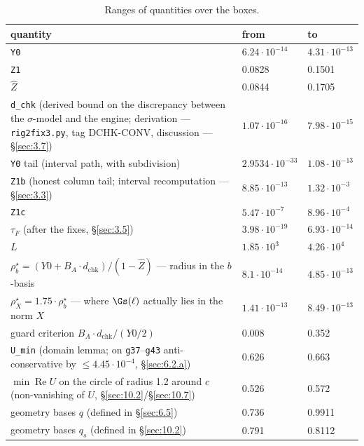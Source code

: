 \begin{table}[h]
\centering
\caption{Ranges of quantities over the boxes.}\label{tab:3.6-ranges}
{\small\setlength{\tabcolsep}{4pt}
\begin{tabular}{>{\raggedright\arraybackslash}p{}ll}
\toprule
quantity & from & to \\
\midrule
\texttt{Y0} & $6.24\cdot 10^{-14}$ & $4.31\cdot 10^{-13}$ \\
\texttt{Z1} & 0.0828 & 0.1501 \\
$\widehat{Z}$ & 0.0844 & 0.1705 \\
\texttt{d\_chk} (derived bound on the discrepancy between the $\sigma$-model and the engine; derivation --- \texttt{rig2fix3.py}, tag DCHK-CONV, discussion --- \S\ref{sec:3.7}) & $1.07\cdot 10^{-16}$ & $7.98\cdot 10^{-15}$ \\
\texttt{Y0} tail (interval path, with subdivision) & $2.9534\cdot 10^{-33}$ & $1.08\cdot 10^{-13}$ \\
\texttt{Z1b} (honest column tail; interval recomputation --- \S\ref{sec:3.3}) & $8.85\cdot 10^{-13}$ & $1.32\cdot 10^{-3}$ \\
\texttt{Z1c} & $5.47\cdot 10^{-7}$ & $8.96\cdot 10^{-4}$ \\
$\tau_{F}$ (after the fixes, \S\ref{sec:3.5}) & $3.98\cdot 10^{-19}$ & $6.93\cdot 10^{-14}$ \\
$L$ & $1.85\cdot 10^{3}$ & $4.26\cdot 10^{4}$ \\
$\rho^{\star}_{b} = (Y0 + B_{A}\cdot d_{\mathrm{chk}})/(1-\widehat{Z})$ --- radius in the $b$-basis & $8.1\cdot 10^{-14}$ & $4.85\cdot 10^{-13}$ \\
$\rho^{\star}_{X} = 1.75\cdot \rho^{\star}_{b}$ --- where $\Gs(\ell)$ actually lies in the norm $X$ & $1.41\cdot 10^{-13}$ & $8.49\cdot 10^{-13}$ \\
guard criterion $B_{A}\cdot d_{\mathrm{chk}} / (Y0/2)$ & 0.008 & 0.352 \\
\texttt{U\_min} (domain lemma; on \texttt{g37}--\texttt{g43} anti-conservative by $\le 4.45\cdot10^{-4}$, \S\ref{sec:6.2.a}) & 0.626 & 0.663 \\
$\min \operatorname{Re} U$ on the circle of radius 1.2 around $c$ (non-vanishing of $U$, \S\ref{sec:10.2}/\S\ref{sec:10.7}) & 0.526 & 0.572 \\
geometry bases $q$ (defined in \S\ref{sec:6.5}) & 0.736 & 0.9911 \\
geometry bases $q_s$ (defined in \S\ref{sec:10.2}) & 0.791 & 0.8112 \\
\bottomrule
\end{tabular}}
\end{table}
\FloatBarrier


